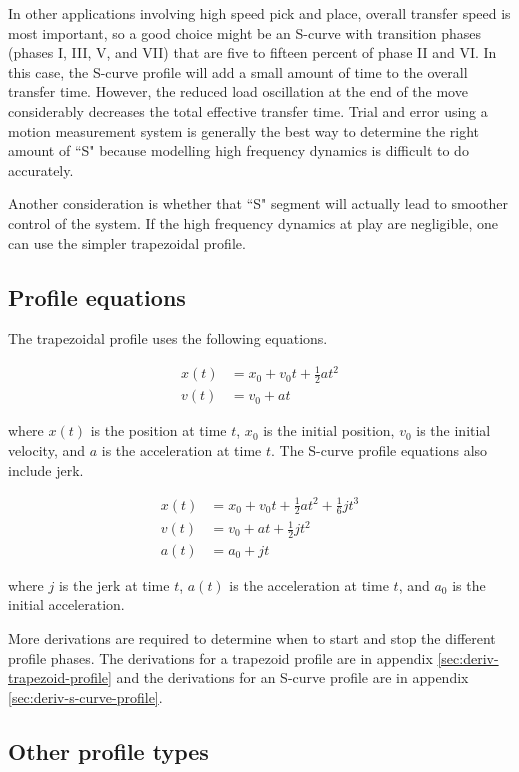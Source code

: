 In other applications involving high speed pick and place, overall transfer
speed is most important, so a good choice might be an S-curve with transition
phases (phases I, III, V, and VII) that are five to fifteen percent of phase II
and VI. In this case, the S-curve profile will add a small amount of time to the
overall transfer time. However, the reduced load oscillation at the end of the
move considerably decreases the total effective transfer time. Trial and error
using a motion measurement system is generally the best way to determine the
right amount of ``S" because modelling high frequency dynamics is difficult to
do accurately.

Another consideration is whether that ``S" segment will actually lead to
smoother control of the system. If the high frequency dynamics at play are
negligible, one can use the simpler trapezoidal profile.

\subsection{Profile equations}

The trapezoidal profile uses the following equations.

\begin{align*}
  x(t) &= x_0 + v_0t + \frac{1}{2}at^2 \\
  v(t) &= v_0 + at
\end{align*}

where $x(t)$ is the position at time $t$, $x_0$ is the initial position, $v_0$
is the initial velocity, and $a$ is the acceleration at time $t$. The S-curve
profile equations also include jerk.

\begin{align*}
  x(t) &= x_0 + v_0t + \frac{1}{2}at^2 + \frac{1}{6}jt^3 \\
  v(t) &= v_0 + at + \frac{1}{2}jt^2 \\
  a(t) &= a_0 + jt
\end{align*}

where $j$ is the jerk at time $t$, $a(t)$ is the acceleration at time $t$, and
$a_0$ is the initial acceleration.

More derivations are required to determine when to start and stop the different
profile phases. The derivations for a trapezoid profile are in appendix \ref{sec:deriv-trapezoid-profile} and the derivations for an S-curve profile are in
appendix \ref{sec:deriv-s-curve-profile}.

\subsection{Other profile types}


